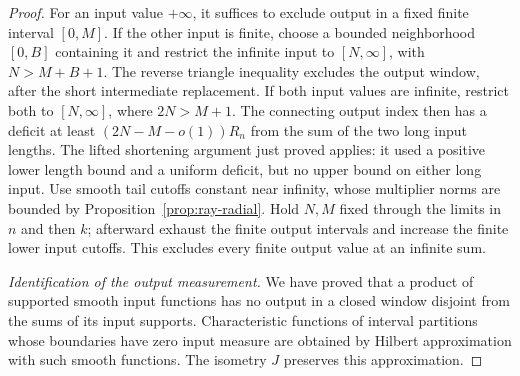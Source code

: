 \begin{proof}
For an input value \(+\infty\), it suffices to exclude output
in a fixed finite interval \([0,M]\).  If the other input is
finite, choose a bounded neighborhood \([0,B]\) containing it
and restrict the infinite input to \([N,\infty]\), with
\(N>M+B+1\).  The reverse triangle inequality excludes the
output window, after the short intermediate replacement.  If
both input values are infinite, restrict both to
\([N,\infty]\), where \(2N>M+1\).  The connecting output index
then has a deficit at least \((2N-M-o(1))R_n\) from the sum of
the two long input lengths.  The lifted shortening argument just
proved applies: it used a positive lower length bound and a
uniform deficit, but no upper bound on either long input.
Use smooth tail cutoffs constant near infinity, whose multiplier
norms are bounded by Proposition~\ref{prop:ray-radial}.  Hold
\(N,M\) fixed through the limits in \(n\) and then \(k\);
afterward exhaust the finite output intervals and increase the
finite lower input cutoffs.  This excludes every finite output
value at an infinite sum.

\par\smallskip\noindent\textit{Identification of the output measurement.}\quad
We have proved that a product of supported smooth input functions
has no output in a closed window disjoint from the sums of its
input supports.  Characteristic functions of interval partitions
whose boundaries have zero input measure are obtained by Hilbert
approximation with such smooth functions.  The isometry \(J\)
preserves this approximation.


\end{proof}
